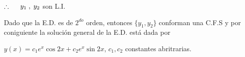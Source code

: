 \documentclass{beamer}
\begin{document}
\begin{frame}[t]
	\begin{alertblock}{}
		\begin{center}
			\(\therefore \hspace{5mm} y_1 \;,\; y_2\) son L.I.
		\end{center}
		Dado que la E.D. es de \(2^{do}\) orden, entonces \(\{y_1,y_2\}\) conforman una C.F.S y por coniguiente la solución general de la E.D. está dada por
		\begin{center}
			\color{red} \underline{\color{black} \(y(x) = c_1e^x \cos 2x+c_2e^x \sin 2x\)}\color{black}, \(c_1,c_2\) constantes abritrarias.
		\end{center}
	\end{alertblock}
\end{frame}
\end{document}
